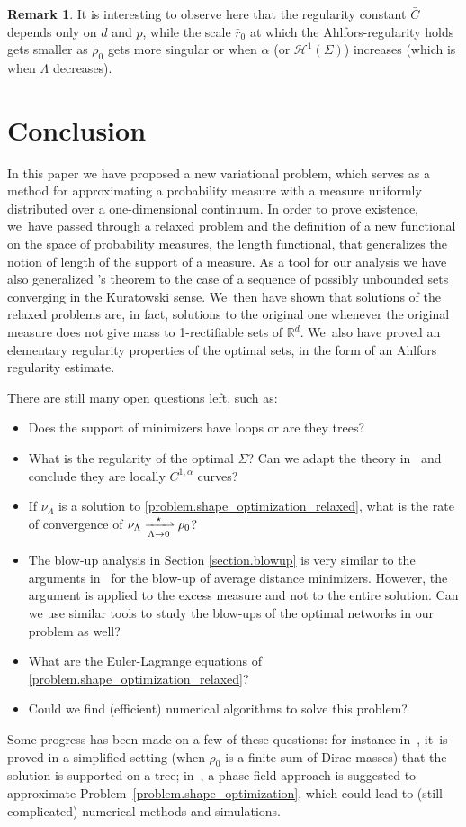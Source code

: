 \documentclass[11pt]{article}
\numberwithin{equation}{section}
\theoremstyle{definition}
\newtheorem{remark}[theorem]{Remark}
\newcommand\cH{\mathcal{H}}
\newcommand{\RR}{\mathbb{R}}
\begin{document}
\begin{remark} It is interesting to observe here that the regularity constant
$\bar C$ depends only on $d$ and $p$, while the scale $\bar r_0$ at which the Ahlfors-regularity
holds gets smaller as $\rho_0$ gets more singular or when $\alpha$ (or $\cH^1(\Sigma)$) increases (which is when $\Lambda$ decreases).
\end{remark}

\section{Conclusion}\label{section.conclusion}
In this paper we have proposed a new variational problem, which serves as a method for approximating a probability measure with a measure uniformly distributed over a one-dimensional continuum.
In order to prove existence, we~have passed through a relaxed problem and the definition of a new functional on the space of probability measures, the length functional, that generalizes the notion of length of the support of a measure. As a tool for our analysis we have also generalized \Golab's theorem to the case of a sequence of possibly unbounded sets converging in the Kuratowski sense. We~then have shown that solutions of the relaxed
problems are, in fact, solutions to the original one whenever the original measure does not give mass to 1-rectifiable sets of $\RR^d$. We~also have proved an elementary regularity properties of the
optimal sets, in the form of an Ahlfors regularity estimate.

There are still many open questions left, such as:
\begin{itemize}
\item Does the support of minimizers have loops or are they trees?
\item What is the regularity of the optimal $\Sigma$? Can we adapt the theory in~\cite{morgan1994m} and conclude they are locally $C^{1,\alpha}$ curves?
\item If $\nu_\Lambda$ is a solution to \eqref{problem.shape_optimization_relaxed}, what is the rate of convergence of $\nu_\Lambda \xrightharpoonup[\Lambda \to 0]{\star} \rho_0$?
\item The blow-up analysis in Section \ref{section.blowup} is very similar to the arguments in~\cite{santambrogio2005blow} for the blow-up of average distance minimizers. However, the argument is applied to the excess measure and not to the entire solution. Can we use similar tools to study the blow-ups of the optimal networks in our problem as well?
\item What are the Euler-Lagrange equations of \eqref{problem.shape_optimization_relaxed}?
\item Could we find (efficient) numerical algorithms to solve this problem?
\end{itemize}
Some progress has been made on a few of these questions: for instance in~\cite{MachadoThesis},
it~is proved in a simplified setting (when $\rho_0$ is a finite sum
of Dirac masses) that the solution is supported on a tree; in~\cite{MachadoPhaseField},
a phase-field approach is suggested to approximate Problem~\eqref{problem.shape_optimization}, which could
lead to (still complicated) numerical methods and simulations.
\end{document}

